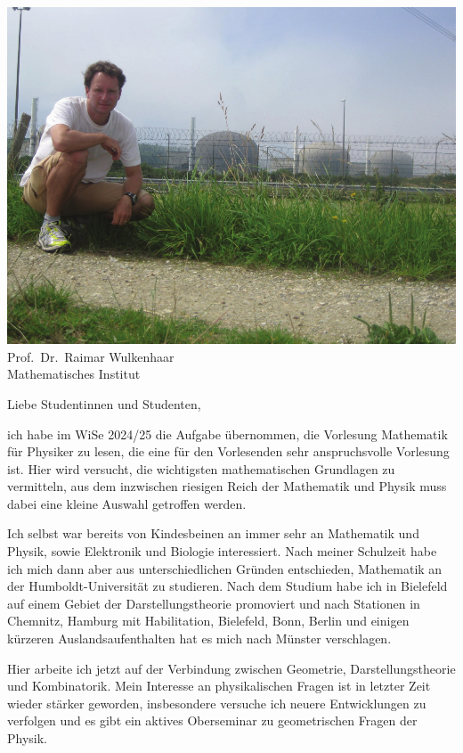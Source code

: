 \vfill

\newpage

\begin{multicols}{2}
\begin{center}
	\includegraphics[width=\columnwidth, height=0.35\textheight]{res/vorstellungsfotos/wulkenhaar.png}\\
	\smallskip
 	Prof.\ Dr.\ Raimar Wulkenhaar\\
	Mathematisches Institut
\end{center}
Liebe Studentinnen und Studenten,

ich habe im WiSe 2024/25 die Aufgabe übernommen, die Vorlesung Mathematik für Physiker zu lesen, die eine für den Vorlesenden sehr anspruchsvolle Vorlesung ist. Hier wird versucht, die wichtigsten mathematischen Grundlagen zu vermitteln, aus dem inzwischen riesigen Reich der Mathematik und Physik muss dabei eine kleine Auswahl getroffen werden.

Ich selbst war bereits von Kindesbeinen an immer sehr an Mathematik und Physik, sowie Elektronik und Biologie interessiert. Nach meiner Schulzeit habe ich mich dann aber aus unterschiedlichen Gründen entschieden, Mathematik an der Humboldt-Universität zu studieren. Nach dem Studium habe ich in Bielefeld auf einem Gebiet der Darstellungstheorie promoviert und nach Stationen in Chemnitz, Hamburg mit Habilitation, Bielefeld, Bonn, Berlin und einigen kürzeren Auslandsaufenthalten hat es mich nach Münster verschlagen.

Hier arbeite ich jetzt auf der Verbindung zwischen Geometrie, Darstellungstheorie und Kombinatorik. Mein Interesse an physikalischen Fragen ist in letzter Zeit wieder stärker geworden, insbesondere versuche ich neuere Entwicklungen zu verfolgen und es gibt ein aktives Oberseminar zu geometrischen Fragen der Physik.


\end{multicols}
